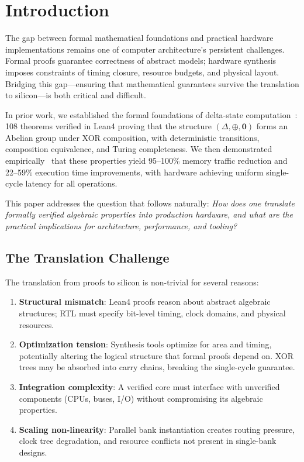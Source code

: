 \documentclass[11pt,letterpaper]{article}
\theoremstyle{plain}
\theoremstyle{definition}
\theoremstyle{remark}
\newcommand{\dcompose}{\oplus}
\newcommand{\dzero}{\mathbf{0}}
\begin{document}
\section{Introduction}
\label{sec:introduction}

The gap between formal mathematical foundations and practical hardware implementations remains one of computer architecture's persistent challenges. Formal proofs guarantee correctness of abstract models; hardware synthesis imposes constraints of timing closure, resource budgets, and physical layout. Bridging this gap---ensuring that mathematical guarantees survive the translation to silicon---is both critical and difficult.

In prior work, we established the formal foundations of delta-state computation~\cite{paper1}: 108 theorems verified in Lean4 proving that the structure $(\Delta, \dcompose, \dzero)$ forms an Abelian group under XOR composition, with deterministic transitions, composition equivalence, and Turing completeness. We then demonstrated empirically~\cite{paper2} that these properties yield 95--100\% memory traffic reduction and 22--59\% execution time improvements, with hardware achieving uniform single-cycle latency for all operations.

This paper addresses the question that follows naturally: \emph{How does one translate formally verified algebraic properties into production hardware, and what are the practical implications for architecture, performance, and tooling?}

\subsection{The Translation Challenge}

The translation from proofs to silicon is non-trivial for several reasons:

\begin{enumerate}
    \item \textbf{Structural mismatch}: Lean4 proofs reason about abstract algebraic structures; RTL must specify bit-level timing, clock domains, and physical resources.

    \item \textbf{Optimization tension}: Synthesis tools optimize for area and timing, potentially altering the logical structure that formal proofs depend on. XOR trees may be absorbed into carry chains, breaking the single-cycle guarantee.

    \item \textbf{Integration complexity}: A verified core must interface with unverified components (CPUs, buses, I/O) without compromising its algebraic properties.

    \item \textbf{Scaling non-linearity}: Parallel bank instantiation creates routing pressure, clock tree degradation, and resource conflicts not present in single-bank designs.
\end{enumerate}
\end{document}

